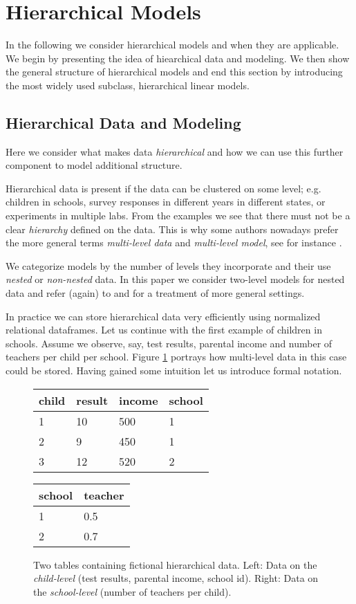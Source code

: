 \section{Hierarchical Models}
In the following we consider hierarchical models and when they are applicable.
We begin by presenting the idea of hiearchical data and modeling.
We then show the general structure of hierarchical models and end this section by introducing the most widely used subclass, hierarchical linear models.

\subsection{Hierarchical Data and Modeling}
Here we consider what makes data \emph{hierarchical} and how we can use this further component to model additional structure.

Hierarchical data is present if the data can be clustered on some level; e.g. children in schools, survey responses in different years in different states, or experiments in multiple labs.
From the examples we see that there must not be a clear \emph{hierarchy} defined on the data.
This is why some authors nowadays prefer the more general terms \emph{multi-level data} and \emph{multi-level model}, see for instance \citet{GelmanHill2007}.

We categorize models by the number of levels they incorporate and their use \emph{nested} or \emph{non-nested} data.
In this paper we consider two-level models for nested data and refer (again) to \citet{GelmanHill2007} and \citet{snijders1999} for a treatment of more general settings.

In practice we can store hierarchical data very efficiently using normalized relational dataframes.
Let us continue with the first example of children in schools.
Assume we observe, say, test results, parental income and number of teachers per child per school.
Figure \ref{fig:relational_table} portrays how multi-level data in this case could be stored.
Having gained some intuition let us introduce formal notation.
\begin{figure}[!ht]
\begin{center}
\begin{tabular}{l l l l}
child & result & income & school\\
\hline
1 & 10 & 500 & 1\\
2 & 9 & 450 & 1\\
3 & 12 & 520 & 2
\end{tabular}
\quad
\begin{tabular}{l l}
school & teacher\\
\hline
1 & 0.5\\
2 & 0.7
\end{tabular}
\end{center}
\caption{Two tables containing fictional hierarchical data. Left: Data on the \emph{child-level} (test results, parental income, school id). Right: Data on the \emph{school-level} (number of teachers per child).}
\label{fig:relational_table}
\end{figure}

